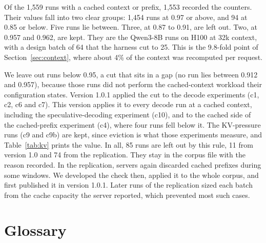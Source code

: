 \documentclass[11pt]{article}
\begin{document}
Of the 1,559 runs with a cached context or prefix, 1,553 recorded the counters. Their values fall into two clear groups: 1,454 runs at 0.97 or above, and 94 at 0.85 or below. Five runs lie between. Three, at 0.87 to 0.91, are left out. Two, at 0.957 and 0.962, are kept. They are the Qwen3-8B runs on H100 at 32k context, with a design batch of 64 that the harness cut to 25. This is the 9.8-fold point of Section~\ref{sec:context}, where about 4\% of the context was recomputed per request.

We leave out runs below 0.95, a cut that sits in a gap (no run lies between 0.912 and 0.957), because those runs did not perform the cached-context workload their configuration states. Version 1.0.1 applied the cut to the decode experiments (c1, c2, c6 and c7). This version applies it to every decode run at a cached context, including the speculative-decoding experiment (c10), and to the cached side of the cached-prefix experiment (c4), where four runs fell below it. The KV-pressure runs (c9 and c9b) are kept, since eviction is what those experiments measure, and Table~\ref{tab:kv} prints the value. In all, 85 runs are left out by this rule, 11 from version 1.0 and 74 from the replication. They stay in the corpus file with the reason recorded. In the replication, servers again discarded cached prefixes during some windows. We developed the check then, applied it to the whole corpus, and first published it in version 1.0.1. Later runs of the replication sized each batch from the cache capacity the server reported, which prevented most such cases.


























\section{Glossary}\label{app:glossary}
\end{document}
